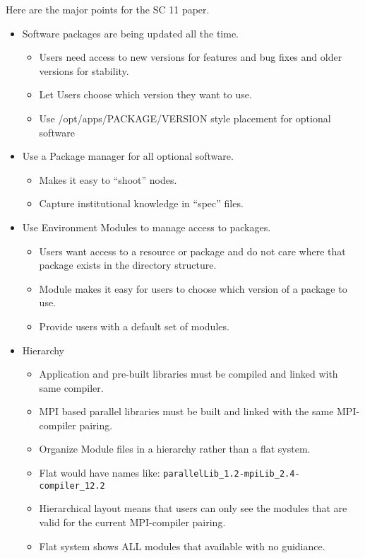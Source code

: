\documentclass[12pt]{article}
\begin{document}
Here are the major points for the SC 11 paper.

\begin{itemize}
  \item Software packages are being updated all the time.
    \begin{itemize}
      \item Users need access to new versions for features and bug
        fixes and older versions for stability.
      \item Let Users choose which version they want to use.
      \item Use /opt/apps/PACKAGE/VERSION style placement for optional
        software 
    \end{itemize}

  \item Use a Package manager for all optional software.
    \begin{itemize}
      \item Makes it easy to ``shoot'' nodes.
      \item Capture institutional knowledge in ``spec'' files.
    \end{itemize}

  \item Use Environment Modules to manage access to packages.
    \begin{itemize}
      \item Users want access to a resource or package and do not care
        where that package exists in the directory structure.
      \item Module makes it easy for users to choose which version of
        a package to use.
      \item Provide users with a default set of modules.
    \end{itemize}

  \item Hierarchy
    \begin{itemize}
      \item Application and pre-built libraries must be compiled and
        linked with same compiler.
      \item MPI based parallel libraries must be built and linked with
        the same MPI-compiler pairing.
      \item Organize Module files in a hierarchy rather than a flat system.
      \item Flat would have names like:
        \texttt{parallelLib\_1.2-mpiLib\_2.4-compiler\_12.2}
      \item Hierarchical layout means that users can only see the
        modules that are valid for the current MPI-compiler pairing.
      \item Flat system shows ALL modules that available with no guidiance.
    \end{itemize}



\end{itemize}
\end{document}

